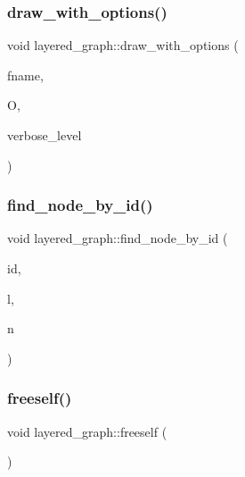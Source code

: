 \subsubsection{\texorpdfstring{draw\+\_\+with\+\_\+options()}{draw\_with\_options()}}
{\footnotesize\ttfamily void layered\+\_\+graph\+::draw\+\_\+with\+\_\+options (\begin{DoxyParamCaption}\item[{const char $\ast$}]{fname,  }\item[{\mbox{\hyperlink{classlayered__graph__draw__options}{layered\+\_\+graph\+\_\+draw\+\_\+options}} $\ast$}]{O,  }\item[{\mbox{\hyperlink{galois_8h_a09fddde158a3a20bd2dcadb609de11dc}{I\+NT}}}]{verbose\+\_\+level }\end{DoxyParamCaption})}

\mbox{\label{classlayered__graph_a380a87fc8f87f526f71e13670fe5ef12}} 
\subsubsection{\texorpdfstring{find\+\_\+node\+\_\+by\+\_\+id()}{find\_node\_by\_id()}}
{\footnotesize\ttfamily void layered\+\_\+graph\+::find\+\_\+node\+\_\+by\+\_\+id (\begin{DoxyParamCaption}\item[{\mbox{\hyperlink{galois_8h_a09fddde158a3a20bd2dcadb609de11dc}{I\+NT}}}]{id,  }\item[{\mbox{\hyperlink{galois_8h_a09fddde158a3a20bd2dcadb609de11dc}{I\+NT}} \&}]{l,  }\item[{\mbox{\hyperlink{galois_8h_a09fddde158a3a20bd2dcadb609de11dc}{I\+NT}} \&}]{n }\end{DoxyParamCaption})}

\mbox{\label{classlayered__graph_a125d492d12cce07cfad75e6cc9e1e2b0}} 
\subsubsection{\texorpdfstring{freeself()}{freeself()}}
{\footnotesize\ttfamily void layered\+\_\+graph\+::freeself (\begin{DoxyParamCaption}{ }\end{DoxyParamCaption})}

